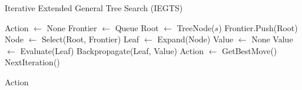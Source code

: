 \begin{algorithm}[H]
    \caption{Iterative Extended General Tree Search (IEGTS)}
    \label{alg:general_tree_search_3}
    \begin{algorithmic}[1]
    
        \State Action $\leftarrow$ None
        \State Frontier $\leftarrow$ Queue
        \State Root $\leftarrow$ TreeNode($s$)
        \State Frontier.Push(Root)
            \State Node $\leftarrow$ Select(Root, Frontier)
            \State Leaf $\leftarrow$ Expand(Node)
            \State Value $\leftarrow$ None
                \State Value $\leftarrow$ Evaluate(Leaf)
            \EndIf
                \State Backpropagate(Leaf, Value)
            \EndIf
                \State Action $\leftarrow$ GetBestMove()
                \State NextIteration()
            \EndIf
        \EndWhile
            
        \State \Return Action
    \EndProcedure
    \end{algorithmic}
\end{algorithm}